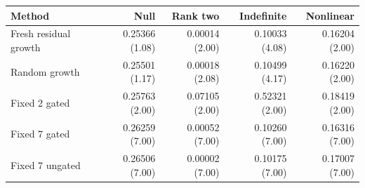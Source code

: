 \begin{tabular}{lrrrr}
\toprule
Method & Null & Rank two & Indefinite & Nonlinear \\
\midrule
Fresh residual growth & 0.25366 (1.08) & 0.00014 (2.00) & 0.10033 (4.08) & 0.16204 (2.00) \\
Random growth & 0.25501 (1.17) & 0.00018 (2.08) & 0.10499 (4.17) & 0.16220 (2.00) \\
Fixed 2 gated & 0.25763 (2.00) & 0.07105 (2.00) & 0.52321 (2.00) & 0.18419 (2.00) \\
Fixed 7 gated & 0.26259 (7.00) & 0.00052 (7.00) & 0.10260 (7.00) & 0.16316 (7.00) \\
Fixed 7 ungated & 0.26506 (7.00) & 0.00002 (7.00) & 0.10175 (7.00) & 0.17007 (7.00) \\
\bottomrule
\end{tabular}
